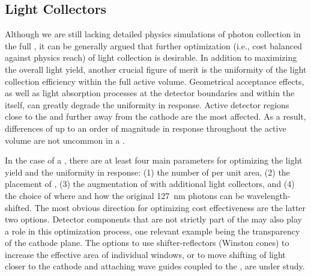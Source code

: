 \subsection{Light Collectors}
\label{sec:fddp-pd-2.5}

Although we are still lacking detailed physics simulations of photon collection in the full  , it can be generally argued that further optimization (i.e., cost 
balanced against physics reach) of light collection is desirable. In addition to  maximizing the overall light yield, another crucial figure of merit is the uniformity of the light collection efficiency within the full  active volume. Geometrical acceptance effects, as well as light absorption processes at the detector boundaries and within the \lar itself, can greatly degrade the uniformity in response. Active detector regions close to the  and further away from the cathode are the most %
affected. As a result, differences of up to an order of magnitude in response throughout the %
active volume are not uncommon in a \lartpc.

In the case of a \lartpc, there are at least four main parameters for optimizing the light yield and the uniformity in response: (1) the number of  per unit area, (2) the placement of , (3) the augmentation of  with additional light collectors, and (4) the choice of where and how the original \SI{127}{nm} photons can be wavelength-shifted. The most obvious direction for optimizing cost effectiveness are the latter two options. Detector components that are not strictly part of the  may also play a role in this optimization process, one relevant example being the transparency of the cathode plane. The options to use shifter-reflectors (Winston cones) to increase the effective area of individual  windows, or to move shifting of light closer to the cathode and attaching wave guides coupled to the , are under study.

